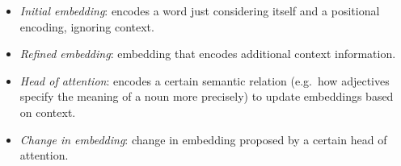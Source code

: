 \newpar{}
\begin{itemize}
    \item \textit{Initial embedding}: encodes a word just considering itself and a positional encoding, ignoring context.
    \item \textit{Refined embedding}: embedding that encodes additional context information.
    \item \textit{Head of attention}: encodes a certain semantic relation (e.g.\ how adjectives specify the meaning of a noun more precisely) to update embeddings based on context.
    \item \textit{Change in embedding}: change in embedding proposed by a certain head of attention.
\end{itemize}


